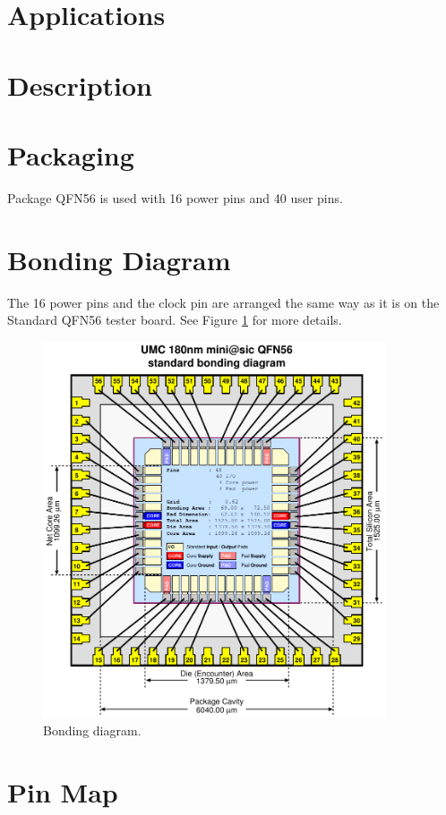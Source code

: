 \section{Applications}
\lipsum[2]

\section{Description}
\lipsum[2]

\section{Packaging}
Package QFN56 is used with 16 power pins and 40 user pins.

\section{Bonding Diagram}
The 16 power pins and the clock pin are arranged the same way as it is on the  Standard QFN56 tester board. See Figure \ref{fig:bonding} for more details.
\begin{figure}[htbp]

  \centering \includegraphics[width=0.9\textwidth]{./figures/qfn56_180_std}
  \caption{Bonding diagram.}
\label{fig:bonding}
\end{figure}
\clearpage
\section{Pin Map}


